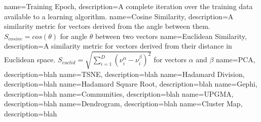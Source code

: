 {
name={Training  Epoch},
description={A complete iteration over the training data available to a learning algorithm.} 
}
{
name={Cosine Similarity},
description={A similarity metric for vectors derived from the angle between them. $S_{cosine}=cos\left(\theta\right)$ for angle $\theta$ between two vectors } 
}
{
name={Euclidean Similarity},
description={A similarity metric for vectors derived from their distance in Euclidean space. $S_{euclid} = \sqrt{\sum_{i=1}^{D}(\nu_i^{\alpha}-\nu_i^{\beta})^{2}}$ for vectors $\alpha$ and $\beta$}
}
{
name={PCA},
description={blah} 
}
{
name={TSNE},
description={blah} 
}
{
name={Hadamard Division},
description={blah} 
}
{
name={Hadamard Square Root},
description={blah} 
}
{
name={Gephi},
description={blah} 
}
{
name={Communities},
description={blah} 
}
{
name={UPGMA},
description={blah} 
}
{
name={Dendrogram},
description={blah} 
}
{
name={Cluster Map},
description={blah} 
}